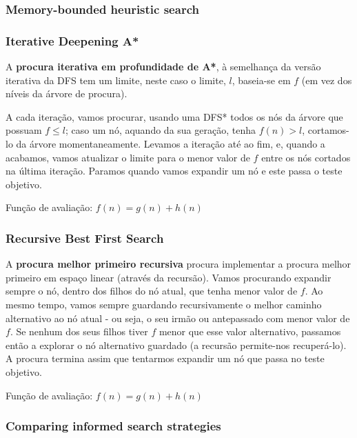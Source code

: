 \documentclass[11pt]{article}
\begin{document}
\subsubsection{Memory-bounded heuristic search}

\subsubsection*{Iterative Deepening A*}

A \textbf{procura iterativa em profundidade de A*}, à semelhança da versão iterativa da DFS tem um limite, neste caso o limite, $l$, baseia-se em $f$ (em vez dos níveis da árvore de procura).\vspace{4pt}

A cada iteração, vamos procurar, usando uma DFS* todos os nós da árvore que possuam $f\leq l$; caso um nó, aquando da sua geração, tenha $f(n)>l$, cortamos-lo da árvore momentaneamente. Levamos a iteração até ao fim, e, quando a acabamos, vamos atualizar o limite para o menor valor de $f$ entre os nós cortados na última iteração. Paramos quando vamos expandir um nó e este passa o teste objetivo.\vspace{10pt}

Função de avaliação: $f(n) = g(n) + h(n)$

\subsubsection*{Recursive Best First Search}

A \textbf{procura melhor primeiro recursiva} procura implementar a procura melhor primeiro em espaço linear (através da recursão). Vamos procurando expandir sempre o nó, dentro dos filhos do nó atual, que tenha menor valor de $f$. Ao mesmo tempo, vamos sempre guardando recursivamente o melhor caminho alternativo ao nó atual - ou seja, o seu irmão ou antepassado com menor valor de $f$. Se nenhum dos seus filhos tiver $f$ menor que esse valor alternativo, passamos então a explorar o nó alternativo guardado (a recursão permite-nos recuperá-lo). A procura termina assim que tentarmos expandir um nó que passa no teste objetivo.\vspace{10pt}

Função de avaliação: $f(n) = g(n) + h(n)$

\subsubsection{Comparing informed search strategies}
\end{document}
